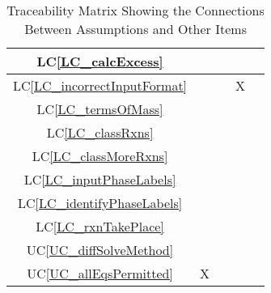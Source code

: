 \documentclass[12pt]{article}
\newcommand{\lcref}[1]{LC\ref{#1}}
\newcommand{\ucref}[1]{UC\ref{#1}}
\begin{document}
\begin{table}[h!]
{\begin{tabular}{|c|c|c|c|c|}
      \lcref{LC_calcExcess}           &                       &                     &                             &                      \\ \hline
      \lcref{LC_incorrectInputFormat} &                       &                     & X                           &                      \\ \hline
      \lcref{LC_termsOfMass}          &                       &                     &                             &                      \\ \hline
      \lcref{LC_classRxns}            &                       &                     &                             &                      \\ \hline
      \lcref{LC_classMoreRxns}        &                       &                     &                             &                      \\ \hline
      \lcref{LC_inputPhaseLabels}     &                       &                     &                             &                      \\ \hline
      \lcref{LC_identifyPhaseLabels}  &                       &                     &                             &                      \\ \hline
      \lcref{LC_rxnTakePlace}         &                       &                     &                             &                      \\ \hline
      \ucref{UC_diffSolveMethod}      &                       &                     &                             &                      \\ \hline
      \ucref{UC_allEqsPermitted}      & X                     &                     &                             &                      \\ \hline
    \end{tabular}
    \caption{Traceability Matrix Showing the Connections Between Assumptions and Other Items}
    \label{Table:A_trace}
  }
\end{table}

\newpage


\end{document}
